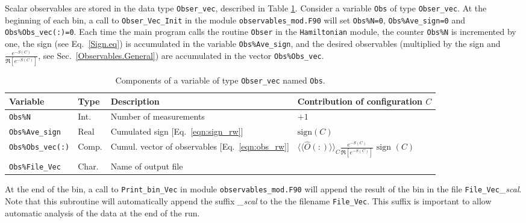 Scalar observables are stored in the data type \texttt{Obser\_vec}, described in Table \ref{table:Obser_vec}. Consider  a variable \texttt{Obs} of type  \texttt{Obser\_vec}.  At the beginning of each bin,  a call to  \texttt{Obser\_Vec\_Init} in the module \texttt{observables\_mod.F90}  will  set   \texttt{Obs\%N=0},   \texttt{Obs\%Ave\_sign=0}  and  \texttt{Obs\%Obs\_vec(:)=0}.  Each time the main  program calls the routine \texttt{Obser}  in the  \texttt{Hamiltonian} module,  the counter \texttt{Obs\%N}   is incremented by one, the sign  (see Eq.~\ref{Sign.eq}) is accumulated in the  variable \texttt{Obs\%Ave\_sign},  and the desired observables (multiplied by the sign and   $\frac{e^{-S(C)}} {\Re \left[e^{-S(C)} \right]}$, see Sec.~\ref{Observables.General})  are accumulated in the vector \texttt{Obs\%Obs\_vec}.  
%
\begin{table}[h]
   \begin{tabular}{@{} l l l l @{}}\toprule
    Variable  &  Type      &  Description &  Contribution of configuration $C$ \\\midrule
    \texttt{Obs\%N}                       &  Int.       &    Number of measurements &    $+1$ \\
    \texttt{Obs\%Ave\_sign}               &  Real     	&    Cumulated sign [Eq.~\eqref{eqn:sign_rw}] & $\text{sign}(C)$  \\
    \texttt{Obs\%Obs\_vec(:)}  		      &  Comp.      &    Cumul. vector of observables [Eq.~\eqref{eqn:obs_rw}] &
           $ \langle \langle \hat{O}(:) \rangle \rangle_{C}\frac{e^{-S(C)}} {\Re \left[e^{-S(C)} \right]} \text{ sign }(C) $ \\
     \texttt{Obs\%File\_Vec}           &  Char.    &    Name of output file  &\\\bottomrule
   \end{tabular}
   \caption{Components of a variable of type \texttt{Obser\_vec} named \texttt{Obs}.}
         \label{table:Obser_vec}
\end{table}
%
At the end of the bin, a call to  \texttt{Print\_bin\_Vec}   in  module \texttt{observables\_mod.F90}  will  append the result of the bin in the file  \texttt{File\_Vec}\emph{\_scal}.  Note that this subroutine will automatically append the suffix \emph{\_scal}
to the the filename \texttt{File\_Vec}.
This suffix  is important to allow automatic analysis of the data at the end of the run. 

